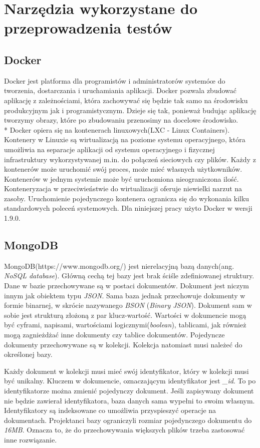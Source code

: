 \chapter{Narzędzia wykorzystane do przeprowadzenia testów}

\section{Docker}
Docker jest platforma dla programistów i administratorów systemóœ do tworzenia, dostarczania i uruchamiania aplikacji. Docker pozwala zbudować aplikację z zależnościami, która zachowywać się będzie tak samo na środowisku produkcyjnym jak i programistycznym. Dzieje się tak, ponieważ budując aplikację tworzymy obrazy, które po zbudowaniu przenosimy na docelowe środowisko.\\*
Docker opiera się na kontenerach linuxowych(LXC - Linux Containers). Kontenery w Linuxie są wirtualizacją na poziome systemu operacyjnego, która umożliwia na separacje aplikacji od systemu operacyjnego i fizycznej infrastruktury wykorzystywanej m.in. do połączeń sieciowych czy plików. Każdy z kontenerów może uruchomić swój proces, może mieć własnych użytkowników. Kontenerów w jednym systemie może być uruchomiona nieograniczona ilość. Konteneryzacja w przeciwieństwie do wirtualizacji  oferuje niewielki narzut na zasoby. Uruchomienie pojedynczego kontenera ogranicza się do wykonania kilku standardowych poleceń systemowych. 
Dla niniejszej pracy użyto Docker w wersji 1.9.0.

\section{MongoDB}
MongoDB(https://www.mongodb.org/) jest nierelacyjną bazą danych(ang. \textsl{NoSQL database}). Główną cechą tej bazy jest brak ściśle zdefiniowanej struktury. Dane w bazie przechowywane są w postaci dokumentów. Dokument jest niczym innym jak obiektem typu \textsl{JSON}. Sama baza jednak przechowuje dokumenty w formie binarnej, w skrócie nazywanego \textsl{BSON} (\textsl{Binary JSON}). Dokument sam w sobie jest strukturą złożoną z par klucz-wartość. Wartości w dokumencie mogą być cyframi, napisami, wartościami logicznymi(\textsl{boolean}), tablicami, jak również mogą zagnieżdżać inne dokumenty czy tablice dokumentów. Pojedyncze dokumenty przechowywane są w kolekcji. Kolekcja natomiast musi należeć do określonej bazy.

Każdy dokument w kolekcji musi mieć swój identyfikator, który w kolekcji musi być unikalny. Kluczem w dokumencie, oznaczającym identyfikator jest \textsl{\_id}. To po identyfikatorze można zmienić pojedynczy dokument. Jeśli zapisywany dokument nie będzie zawierał identyfikatora, baza danych sama wypełni to swoim własnym. Identyfikatory są indeksowane co umożliwia przyspieszyć operacje na dokumentach. Projektanci bazy ograniczyli rozmiar pojedynczego dokumentu do \textsl{16MB}. Oznacza to, że do przechowywania większych plików trzeba zastosować inne rozwiązanie.

